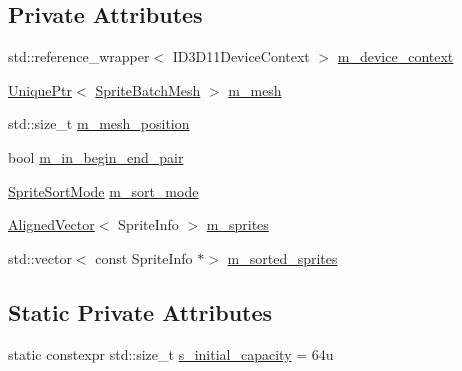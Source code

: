 \subsection*{Private Attributes}
\begin{DoxyCompactItemize}
\item 
std\+::reference\+\_\+wrapper$<$ I\+D3\+D11\+Device\+Context $>$ \mbox{\hyperlink{classmage_1_1rendering_1_1_sprite_batch_1_1_impl_a4072773cc783a776fdfa5cb069403ce4}{m\+\_\+device\+\_\+context}}
\item 
\mbox{\hyperlink{namespacemage_a3316d7143a973e37adf1110f2e80ca31}{Unique\+Ptr}}$<$ \mbox{\hyperlink{classmage_1_1rendering_1_1_sprite_batch_mesh}{Sprite\+Batch\+Mesh}} $>$ \mbox{\hyperlink{classmage_1_1rendering_1_1_sprite_batch_1_1_impl_a6ea37418810939906de6614c6233b4be}{m\+\_\+mesh}}
\item 
std\+::size\+\_\+t \mbox{\hyperlink{classmage_1_1rendering_1_1_sprite_batch_1_1_impl_adadb176f804bee0c0c65463e4c8759bd}{m\+\_\+mesh\+\_\+position}}
\item 
bool \mbox{\hyperlink{classmage_1_1rendering_1_1_sprite_batch_1_1_impl_ad498fe3044bbf1c303119ad4d8edcf7b}{m\+\_\+in\+\_\+begin\+\_\+end\+\_\+pair}}
\item 
\mbox{\hyperlink{namespacemage_1_1rendering_a4fad00dbca0c8d854c765ab831c76055}{Sprite\+Sort\+Mode}} \mbox{\hyperlink{classmage_1_1rendering_1_1_sprite_batch_1_1_impl_a98659f29ee7ea1bdcc8c18ac0dfdcf48}{m\+\_\+sort\+\_\+mode}}
\item 
\mbox{\hyperlink{namespacemage_a8664bfb5ce2179fc64eae9f82c8a5ba8}{Aligned\+Vector}}$<$ Sprite\+Info $>$ \mbox{\hyperlink{classmage_1_1rendering_1_1_sprite_batch_1_1_impl_ad8f211053433418cf5fa6c64402936b3}{m\+\_\+sprites}}
\item 
std\+::vector$<$ const Sprite\+Info $\ast$$>$ \mbox{\hyperlink{classmage_1_1rendering_1_1_sprite_batch_1_1_impl_a1209d58b70713e61bc8f8fc753f9036e}{m\+\_\+sorted\+\_\+sprites}}
\end{DoxyCompactItemize}
\subsection*{Static Private Attributes}
\begin{DoxyCompactItemize}
\item 
static constexpr std\+::size\+\_\+t \mbox{\hyperlink{classmage_1_1rendering_1_1_sprite_batch_1_1_impl_a3c2d72b03b49d79f91cec306e6dff1ec}{s\+\_\+initial\+\_\+capacity}} = 64u
\end{DoxyCompactItemize}


